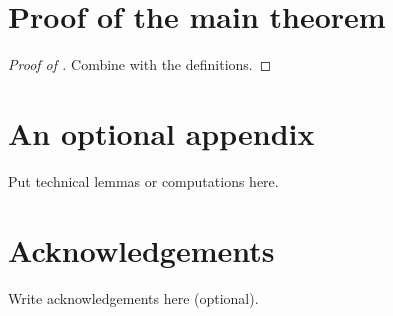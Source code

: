 \documentclass[12pt,reqno]{amsart}
\begin{document}
\section{Proof of the main theorem}\label{sec:proof}
\begin{proof}[Proof of ]
Combine  with the definitions.
\end{proof}

\appendix
\section{An optional appendix}\label{app:extra}
Put technical lemmas or computations here.

\section*{Acknowledgements}
Write acknowledgements here (optional).

\bigskip

\bigskip
\end{document}
